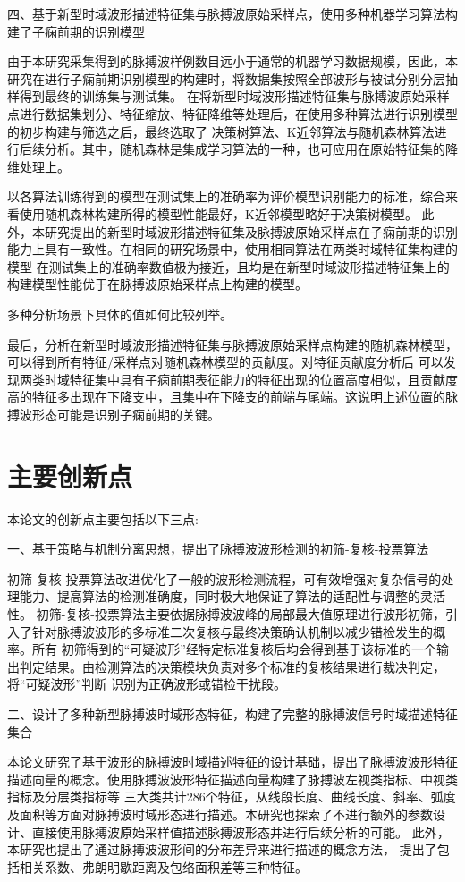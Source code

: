 四、基于新型时域波形描述特征集与脉搏波原始采样点，使用多种机器学习算法构建了子痫前期的识别模型

由于本研究采集得到的脉搏波样例数目远小于通常的机器学习数据规模，因此，本研究在进行子痫前期识别模型的构建时，将数据集按照全部波形与被试分别分层抽样得到最终的训练集与测试集。
在将新型时域波形描述特征集与脉搏波原始采样点进行数据集划分、特征缩放、特征降维等处理后，在使用多种算法进行识别模型的初步构建与筛选之后，最终选取了
决策树算法、K近邻算法与随机森林算法进行后续分析。其中，随机森林是集成学习算法的一种，也可应用在原始特征集的降维处理上。

以各算法训练得到的模型在测试集上的准确率为评价模型识别能力的标准，综合来看使用随机森林构建所得的模型性能最好，K近邻模型略好于决策树模型。
此外，本研究提出的新型时域波形描述特征集及脉搏波原始采样点在子痫前期的识别能力上具有一致性。在相同的研究场景中，使用相同算法在两类时域特征集构建的模型
在测试集上的准确率数值极为接近，且均是在新型时域波形描述特征集上的构建模型性能优于在脉搏波原始采样点上构建的模型。

多种分析场景下具体的值如何比较列举。


最后，分析在新型时域波形描述特征集与脉搏波原始采样点构建的随机森林模型，可以得到所有特征/采样点对随机森林模型的贡献度。对特征贡献度分析后
可以发现两类时域特征集中具有子痫前期表征能力的特征出现的位置高度相似，且贡献度高的特征多出现在下降支中，且集中在下降支的前端与尾端。这说明上述位置的脉搏波形态可能是识别子痫前期的关键。


\section{主要创新点}
本论文的创新点主要包括以下三点:

一、基于策略与机制分离思想，提出了脉搏波波形检测的初筛-复核-投票算法

初筛-复核-投票算法改进优化了一般的波形检测流程，可有效增强对复杂信号的处理能力、提高算法的检测准确度，同时极大地保证了算法的适配性与调整的灵活性。
初筛-复核-投票算法主要依据脉搏波波峰的局部最大值原理进行波形初筛，引入了针对脉搏波波形的多标准二次复核与最终决策确认机制以减少错检发生的概率。所有
初筛得到的“可疑波形”经特定标准复核后均会得到基于该标准的一个输出判定结果。由检测算法的决策模块负责对多个标准的复核结果进行裁决判定，将“可疑波形”判断
识别为正确波形或错检干扰段。

二、设计了多种新型脉搏波时域形态特征，构建了完整的脉搏波信号时域描述特征集合

本论文研究了基于波形的脉搏波时域描述特征的设计基础，提出了脉搏波波形特征描述向量的概念。使用脉搏波波形特征描述向量构建了脉搏波左视类指标、中视类指标及分层类指标等
三大类共计286个特征，从线段长度、曲线长度、斜率、弧度及面积等方面对脉搏波时域形态进行描述。本研究也探索了不进行额外的参数设计、直接使用脉搏波原始采样值描述脉搏波形态并进行后续分析的可能。
此外，本研究也提出了通过脉搏波波形间的分布差异来进行描述的概念方法，
提出了包括相关系数、弗朗明歇距离及包络面积差等三种特征。

